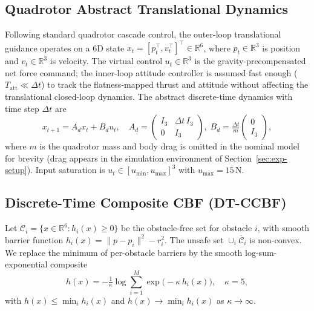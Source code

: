 \documentclass[11pt,onecolumn,a4paper]{article}
\newcommand{\R}{\mathbb{R}}
\newcommand{\dt}{\Delta t}
\begin{document}
\subsection{Quadrotor Abstract Translational Dynamics}

Following standard quadrotor cascade control, the outer-loop
translational guidance operates on a 6D state
$x_t = [p_t^\top, v_t^\top]^\top \in \R^6$, where $p_t \in \R^3$ is
position and $v_t \in \R^3$ is velocity. The virtual control
$u_t \in \R^3$ is the gravity-precompensated net force command; the
inner-loop attitude controller is assumed fast enough
($T_{\mathrm{att}} \ll \dt$) to track the flatness-mapped thrust and
attitude without affecting the translational closed-loop dynamics. The
abstract discrete-time dynamics with time step $\dt$ are
\begin{equation}\label{eq:dyn}
x_{t+1} = A_d x_t + B_d u_t,\quad
A_d = \begin{pmatrix} I_3 & \dt\, I_3 \\ 0 & I_3 \end{pmatrix},\;
B_d = \tfrac{\dt}{m} \begin{pmatrix} 0 \\ I_3 \end{pmatrix},
\end{equation}
where $m$ is the quadrotor mass and body drag is omitted in the
nominal model for brevity (drag appears in the simulation environment
of Section~\ref{sec:exp-setup}). Input saturation is
$u_t \in [u_{\min}, u_{\max}]^3$ with $u_{\max} = 15\,\mathrm{N}$.

\subsection{Discrete-Time Composite CBF (DT-CCBF)}

Let $\mathcal{C}_i = \{x \in \R^6 : h_i(x) \ge 0\}$ be the
obstacle-free set for obstacle $i$, with smooth barrier function
$h_i(x) = \|p - p_i\|^2 - r_i^2$. The unsafe set
$\cup_i \overline{\mathcal{C}}_i$ is non-convex. We replace the
minimum of per-obstacle barriers by the smooth log-sum-exponential
composite
\begin{equation}\label{eq:lse}
h(x) = -\tfrac{1}{\kappa} \log \sum_{i=1}^{M}
\exp\!\big(-\kappa\, h_i(x)\big), \quad \kappa = 5,
\end{equation}
with $h(x) \le \min_i h_i(x)$ and $h(x) \to \min_i h_i(x)$ as
$\kappa \to \infty$.
\end{document}
